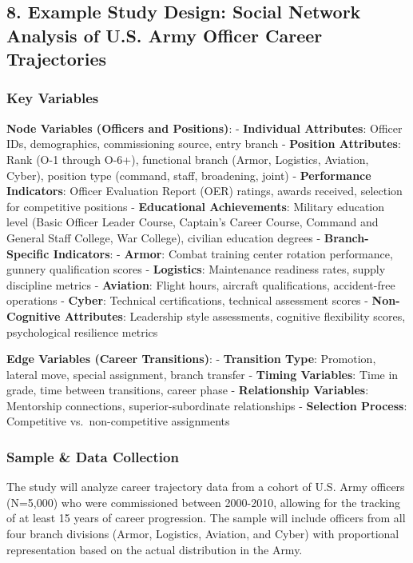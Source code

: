 \documentclass[
  letterpaper,
  DIV=11,
  numbers=noendperiod]{scrartcl}
\begin{document}
\subsection{8. Example Study Design: Social Network Analysis of U.S.
Army Officer Career
Trajectories}\label{example-study-design-social-network-analysis-of-u.s.-army-officer-career-trajectories}

\subsubsection{Key Variables}\label{key-variables}

\textbf{Node Variables (Officers and Positions)}: - \textbf{Individual
Attributes}: Officer IDs, demographics, commissioning source, entry
branch - \textbf{Position Attributes}: Rank (O-1 through O-6+),
functional branch (Armor, Logistics, Aviation, Cyber), position type
(command, staff, broadening, joint) - \textbf{Performance Indicators}:
Officer Evaluation Report (OER) ratings, awards received, selection for
competitive positions - \textbf{Educational Achievements}: Military
education level (Basic Officer Leader Course, Captain's Career Course,
Command and General Staff College, War College), civilian education
degrees - \textbf{Branch-Specific Indicators}: - \textbf{Armor}: Combat
training center rotation performance, gunnery qualification scores -
\textbf{Logistics}: Maintenance readiness rates, supply discipline
metrics - \textbf{Aviation}: Flight hours, aircraft qualifications,
accident-free operations - \textbf{Cyber}: Technical certifications,
technical assessment scores - \textbf{Non-Cognitive Attributes}:
Leadership style assessments, cognitive flexibility scores,
psychological resilience metrics

\textbf{Edge Variables (Career Transitions)}: - \textbf{Transition
Type}: Promotion, lateral move, special assignment, branch transfer -
\textbf{Timing Variables}: Time in grade, time between transitions,
career phase - \textbf{Relationship Variables}: Mentorship connections,
superior-subordinate relationships - \textbf{Selection Process}:
Competitive vs.~non-competitive assignments

\subsubsection{Sample \& Data Collection}\label{sample-data-collection}

The study will analyze career trajectory data from a cohort of U.S. Army
officers (N=5,000) who were commissioned between 2000-2010, allowing for
the tracking of at least 15 years of career progression. The sample will
include officers from all four branch divisions (Armor, Logistics,
Aviation, and Cyber) with proportional representation based on the
actual distribution in the Army.
\end{document}
